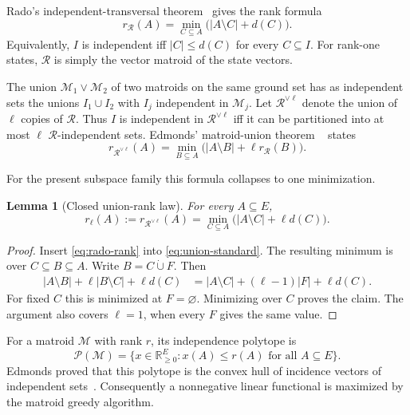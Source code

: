 \documentclass[11pt]{article}
\newtheorem{lemma}[theorem]{Lemma}
\theoremstyle{definition}
\theoremstyle{remark}
\newcommand{\cM}{\mathcal M}
\newcommand{\cP}{\mathcal P}
\newcommand{\cR}{\mathcal R}
\begin{document}
Rado's independent-transversal theorem~\cite{rado1942} gives the rank formula
\begin{equation}\label{eq:rado-rank}
 r_{\cR}(A)=\min_{C\subseteq A}\bigl(|A\setminus C|+d(C)\bigr).
\end{equation}
Equivalently, $I$ is independent iff $|C|\leq d(C)$ for every $C\subseteq I$.
For rank-one states, $\cR$ is simply the vector matroid of the state vectors.

The union $\cM_1\vee\cM_2$ of two matroids on the same ground set has as
independent sets the unions $I_1\cup I_2$ with $I_j$ independent in
$\cM_j$.  Let $\cR^{\vee\ell}$ denote the union of $\ell$ copies of $\cR$.
Thus $I$ is independent in $\cR^{\vee\ell}$ iff it can be partitioned into
at most $\ell$ $\cR$-independent sets.  Edmonds' matroid-union theorem
~\cite{edmonds1965,edmonds1968} states
\begin{equation}\label{eq:union-standard}
 r_{\cR^{\vee\ell}}(A)
 =\min_{B\subseteq A}\bigl(|A\setminus B|+\ell r_{\cR}(B)\bigr).
\end{equation}

For the present subspace family this formula collapses to one minimization.

\begin{lemma}[Closed union-rank law]\label{lem:union-rank}
For every $A\subseteq E$,
\begin{equation}\label{eq:union-rank}
 r_\ell(A):=r_{\cR^{\vee\ell}}(A)
 =\min_{C\subseteq A}\bigl(|A\setminus C|+\ell d(C)\bigr).
\end{equation}
\end{lemma}

\begin{proof}
Insert \eqref{eq:rado-rank} into \eqref{eq:union-standard}.  The resulting
minimum is over $C\subseteq B\subseteq A$.  Write $B=C\mathbin{\dot\cup}F$.
Then
\begin{align*}
 |A\setminus B|+\ell|B\setminus C|+\ell d(C)
 &=|A\setminus C|+(\ell-1)|F|+\ell d(C).
\end{align*}
For fixed $C$ this is minimized at $F=\varnothing$.  Minimizing over $C$
proves the claim.  The argument also covers $\ell=1$, when every $F$ gives
the same value.
\end{proof}

For a matroid $\cM$ with rank $r$, its independence polytope is
\begin{equation}\label{eq:polytope}
 \cP(\cM)=\{x\in\mathbb R_{
 \geq0}^{E}:x(A)\leq r(A)\text{ for all }A\subseteq E\}.
\end{equation}
Edmonds proved that this polytope is the convex hull of incidence vectors of
independent sets~\cite{edmonds1970}.  Consequently a nonnegative linear
functional is maximized by the matroid greedy algorithm.
\end{document}
